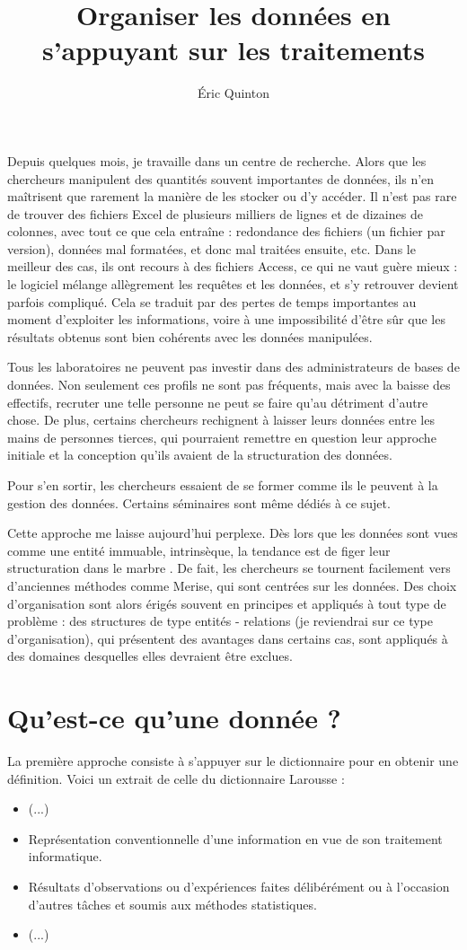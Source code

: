 \documentclass[10pt,a4paper,titlepage]{article}
\author{Éric Quinton}
\title{Organiser les données en s'appuyant sur les traitements}
\begin{document}
Depuis quelques mois, je travaille dans un centre de recherche. Alors que les chercheurs manipulent des quantités souvent importantes de données, ils n'en maîtrisent que rarement la manière de les stocker ou d'y accéder. 
Il n'est pas rare de trouver des fichiers Excel de plusieurs milliers de lignes et de dizaines de colonnes, avec tout ce que cela entraîne : redondance des fichiers (un fichier par version), données mal formatées, et donc mal traitées ensuite, etc. Dans le meilleur des cas, ils ont recours à des fichiers Access, ce qui ne vaut guère mieux : le logiciel mélange allègrement les requêtes et les données, et s'y retrouver devient parfois compliqué.
Cela se traduit par des pertes de temps importantes au moment d'exploiter les informations, voire à une impossibilité d'être sûr que les résultats obtenus sont bien cohérents avec les données manipulées.

Tous les laboratoires ne peuvent pas investir dans des administrateurs de bases de données. Non seulement ces profils ne sont pas fréquents, mais avec la baisse des effectifs, recruter une telle personne ne peut se faire qu'au détriment d'autre chose. De plus, certains chercheurs rechignent à laisser leurs données entre les mains de personnes tierces, qui pourraient remettre en question leur approche initiale et la conception qu'ils avaient de la structuration des données.

Pour s'en sortir, les chercheurs essaient de se former comme ils le peuvent à la gestion des données. Certains séminaires sont même dédiés à ce sujet.

Cette approche me laisse aujourd'hui perplexe. Dès lors que les données sont vues comme une entité immuable, intrinsèque, la tendance est de figer leur structuration \og dans le marbre \fg . De fait, les chercheurs se tournent facilement vers d'anciennes méthodes comme Merise, qui sont centrées sur les données.
Des choix d'organisation sont alors érigés souvent en principes et appliqués à tout type de problème : des structures de type \og entités - relations \fg (je reviendrai sur ce type d'organisation), qui présentent des avantages dans certains cas, sont appliqués à des domaines desquelles elles devraient être exclues.

\section{Qu'est-ce qu'une donnée ?}
La première approche consiste à s'appuyer sur le dictionnaire pour en obtenir une définition. Voici un extrait de celle du dictionnaire Larousse \cite{donnee_larousse} :
\og 
\begin{itemize}

\item \og (...)
\item Représentation conventionnelle d'une information en vue de son traitement informatique.
\item Résultats d'observations ou d'expériences faites délibérément ou à l'occasion d'autres tâches et soumis aux méthodes statistiques.
\item (...)\fg

\end{itemize}
\end{document}
